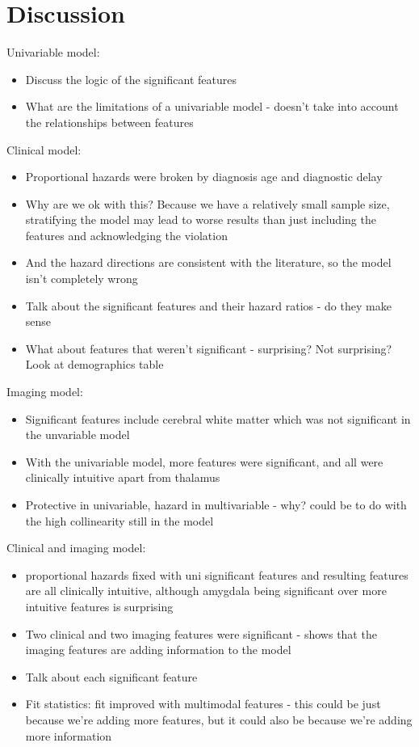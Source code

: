 \section{Discussion}

Univariable model:
\begin{itemize}
    \item Discuss the logic of the significant features
    \item What are the limitations of a univariable model - doesn't take into account the relationships between features
\end{itemize}

Clinical model:
\begin{itemize}
    \item Proportional hazards were broken by diagnosis age and diagnostic delay
    \item Why are we ok with this? Because we have a relatively small sample size, stratifying the model may lead to worse results than just including the features and acknowledging the violation
    \item And the hazard directions are consistent with the literature, so the model isn't completely wrong
    \item Talk about the significant features and their hazard ratios - do they make sense
    \item What about features that weren't significant - surprising? Not surprising? Look at demographics table
\end{itemize}

Imaging model:
\begin{itemize}
    \item Significant features include cerebral white matter which was not significant in the unvariable model
    \item With the univariable model, more features were significant, and all were clinically intuitive apart from thalamus
    \item Protective in univariable, hazard in multivariable - why? could be to do with the high collinearity still in the model
\end{itemize}

Clinical and imaging model:
\begin{itemize}
    \item proportional hazards fixed with uni significant features and resulting features are all clinically intuitive, although amygdala being significant over more intuitive features is surprising
    \item Two clinical and two imaging features were significant - shows that the imaging features are adding information to the model
    \item Talk about each significant feature
    \item Fit statistics: fit improved with multimodal features - this could be just because we're adding more features, but it could also be because we're adding more information
\end{itemize}

